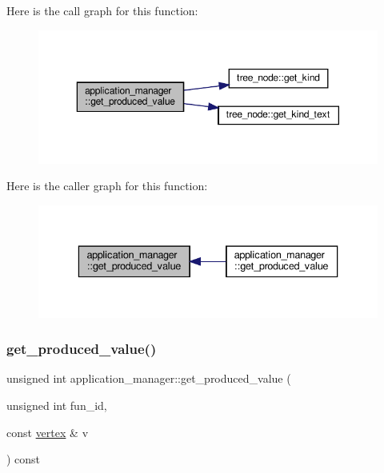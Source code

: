 Here is the call graph for this function\+:
\nopagebreak
\begin{figure}[H]
\begin{center}
\leavevmode
\includegraphics[width=350pt]{dc/db5/classapplication__manager_a045c72426358aa0594dce15ac2138d7a_cgraph}
\end{center}
\end{figure}
Here is the caller graph for this function\+:
\nopagebreak
\begin{figure}[H]
\begin{center}
\leavevmode
\includegraphics[width=336pt]{dc/db5/classapplication__manager_a045c72426358aa0594dce15ac2138d7a_icgraph}
\end{center}
\end{figure}
\mbox{\label{classapplication__manager_ac4bb15c84ffb2500a40746e74b9f238c}} 
\subsubsection{\texorpdfstring{get\+\_\+produced\+\_\+value()}{get\_produced\_value()}\hspace{0.1cm}{\footnotesize\ttfamily [2/2]}}
{\footnotesize\ttfamily unsigned int application\+\_\+manager\+::get\+\_\+produced\+\_\+value (\begin{DoxyParamCaption}\item[{unsigned int}]{fun\+\_\+id,  }\item[{const \hyperlink{graph_8hpp_abefdcf0544e601805af44eca032cca14}{vertex} \&}]{v }\end{DoxyParamCaption}) const}




